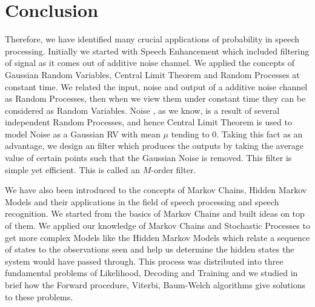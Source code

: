 \documentclass[10pt,twocolumn,letterpaper]{article}
\begin{document}
\section{Conclusion}

\par Therefore, we have identified many crucial applications of probability in speech processing. Initially we started with Speech Enhancement which included filtering of signal as it comes out of additive noise channel. We applied the concepts of Gaussian Random Variables, Central Limit Theorem and Random Processes at constant time. We related the input, noise and output of a additive noise channel as Random Processes, then when we view them under constant time they can be considered as Random Variables. Noise , as we know, is a result of several independent Random Processes, and hence Central Limit Theorem is used to model Noise as a Gaussian RV with mean $\mu$ tending to 0. Taking this fact as an advantage, we design an filter which produces the outputs by taking the average value of certain points such that the Gaussian Noise is removed. This filter is simple yet efficient. This is called an $M$-order filter. \\

\par We have also been introduced to the concepts of Markov Chains, Hidden Markov Models and their applications in the field of speech processing and speech recognition. We started from the basics of Markov Chains and built ideas on top of them. We applied our knowledge of Markov Chains and Stochastic Processes to get more complex Models like the Hidden Markov Models which relate a sequence of states to the observations seen and help us determine the hidden states the system would have passed through. This process was distributed into three fundamental problems of Likelihood, Decoding and Training and we studied in brief how the Forward procedure, Viterbi, Baum-Welch algorithms give solutions to these problems.


\end{document}
